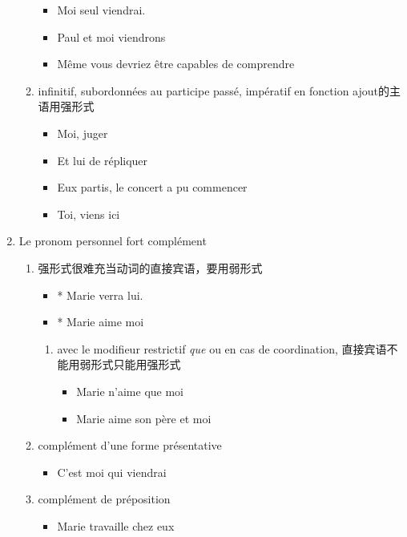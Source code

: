 \documentclass[UTF8]{report}
\begin{document}
\begin{enumerate}
\begin{enumerate}
        \begin{itemize}
            \item Moi seul viendrai.
            \item Paul et moi viendrons
            \item Même vous devriez être capables de comprendre
        \end{itemize}
        \item infinitif, subordonnées au participe passé, impératif en fonction ajout的主语用强形式
        \begin{itemize}
            \item Moi, juger
            \item Et lui de répliquer
            \item Eux partis, le concert a pu commencer
            \item Toi, viens ici
        \end{itemize}
    \end{enumerate}
    \item Le pronom personnel fort complément
    \begin{enumerate}
        \item 强形式很难充当动词的直接宾语，要用弱形式
        \begin{itemize}
            \item * Marie verra lui.
            \item * Marie aime moi
        \end{itemize}
        \begin{enumerate}
            \item avec le modifieur restrictif \emph{que} ou en cas de coordination, 直接宾语不能用弱形式只能用强形式
            \begin{itemize}
                \item Marie n’aime que moi
                \item Marie aime son père et moi
            \end{itemize}
        \end{enumerate}
        \item complément d’une forme présentative 
        \begin{itemize}
            \item C’est moi qui viendrai
        \end{itemize}
        \item complément de préposition
        \begin{itemize}
            \item Marie travaille chez eux

\end{itemize}
\end{enumerate}
\end{enumerate}
\end{document}
